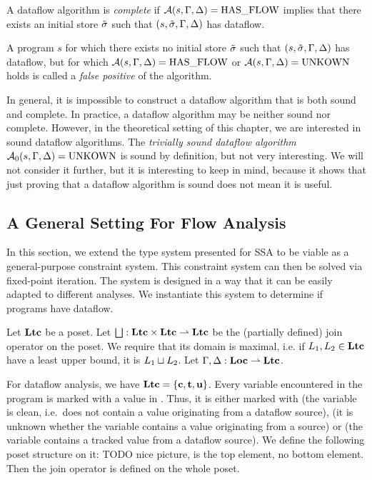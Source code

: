 \begin{definition}[Completeness]
    A dataflow algorithm is \emph{complete} if $\operatorname{\mathcal{A}}(s, \Gamma, \Delta) = \text{HAS\_FLOW}$
    implies that there exists an initial store $\tilde{\sigma}$
     such that $(s, \tilde{\sigma}, \Gamma, \Delta)$ has dataflow.
\end{definition}
\begin{definition}
    A program $s$ for which there exists no initial store $\tilde{\sigma}$ such that 
    $(s, \tilde{\sigma}, \Gamma, \Delta)$ has dataflow, but for which $\operatorname{\mathcal{A}}(s, \Gamma, \Delta) = \text{HAS\_FLOW}$
    or $\operatorname{\mathcal{A}}(s, \Gamma, \Delta) = \text{UNKOWN}$ holds
    is called a \emph{false positive} of the algorithm.
\end{definition}
\begin{remark}
    In general, it is impossible to construct a dataflow algorithm that is both 
    sound and complete.
    In practice, a dataflow algorithm may be neither sound nor complete.
    However, in the theoretical setting of this chapter, we are interested in 
    sound dataflow algorithms.
    The \emph{trivially sound dataflow algorithm} $\operatorname{\mathcal{A}}_0(s, \Gamma, \Delta) = \text{UNKOWN}$ 
    is sound by definition, but not very interesting.
    We will not consider it further, but it is interesting to keep in mind,
    because it shows that just proving that a dataflow algorithm is sound does not
    mean it is useful.    
\end{remark}

\subsection{A General Setting For Flow Analysis}
In this section, we extend the type system presented for SSA to be viable as a
general-purpose constraint system.
This constraint system can then be solved via fixed-point iteration.
The system is designed in a way that it can be easily adapted to different analyses.
We instantiate this system to determine if programs have dataflow.

Let $\textbf{Ltc}$ be a poset.
Let $\mathop\bigsqcup: \textbf{Ltc} \times \textbf{Ltc} \rightharpoonup \textbf{Ltc}$ be the (partially defined)
join operator on the poset.
We require that its domain is maximal, i.e. if $L_1, L_2 \in \textbf{Ltc}$ have a least upper
bound, it is $L_1 \mathbin\sqcup L_2$.
Let $\Gamma, \Delta: \textbf{Loc} \rightharpoonup \textbf{Ltc}$.

For dataflow analysis, we have $\textbf{Ltc} = \{\textbf{c}, \textbf{t}, \textbf{u}\}$.
Every variable encountered in the program is marked with a value in \lattice.
Thus, it is either marked with \lclean{} (the variable
is clean, i.e.\ does not contain a value originating from a dataflow source), \lunknown{}
(it is unknown whether the variable contains a value originating from a source) or \ltracked{}
(the variable contains a tracked value from a dataflow source).
We define the following poset structure on it:
TODO nice picture, \lunknown{} is the top element, no bottom element.
Then the join operator is defined on the whole poset.


